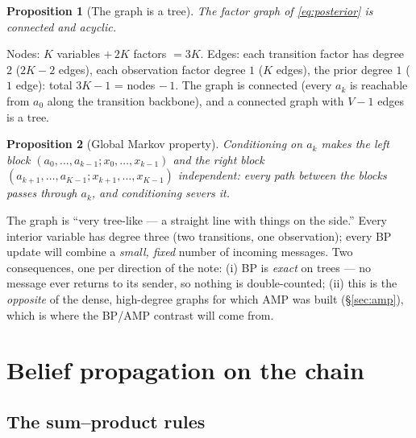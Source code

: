 \documentclass[11pt]{article}
\newtheorem{proposition}{Proposition}
\theoremstyle{definition}
\begin{document}
\begin{proposition}[The graph is a tree]\label{prop:tree}
The factor graph of \eqref{eq:posterior} is connected and acyclic.
\end{proposition}

\begin{derivation}
Nodes: $K$ variables $+\,2K$ factors $=3K$. Edges: each transition factor has
degree $2$ ($2K{-}2$ edges), each observation factor degree $1$ ($K$ edges),
the prior degree $1$ ($1$ edge): total $3K-1$ = nodes $-\,1$. The graph is
connected (every $a_k$ is reachable from $a_0$ along the transition backbone),
and a connected graph with $V-1$ edges is a tree.
\end{derivation}

\begin{proposition}[Global Markov property]\label{prop:markov}
Conditioning on $a_k$ makes the left block
$(a_0,\dots,a_{k-1};x_0,\dots,x_{k-1})$ and the right block
$(a_{k+1},\dots,a_{K-1};x_{k+1},\dots,x_{K-1})$ independent: every path
between the blocks passes through $a_k$, and conditioning severs it.
\end{proposition}

\begin{intuition}
The graph is ``very tree-like --- a straight line with things on the side.''
Every interior variable has degree three (two transitions, one observation);
every BP update will combine a \emph{small, fixed} number of incoming
messages. Two consequences, one per direction of the note: (i) BP is
\emph{exact} on trees \citep[Th.~14.1]{mezard2009information} --- no message
ever returns to its sender, so nothing is double-counted; (ii) this is the
\emph{opposite} of the dense, high-degree graphs for which AMP was built
(\S\ref{sec:amp}), which is where the BP/AMP contrast will come from.
\end{intuition}

\section{Belief propagation on the chain}\label{sec:bp}

\subsection{The sum--product rules}
\end{document}
